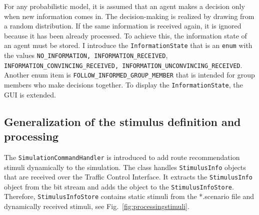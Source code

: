 For any probabilistic model, it is assumed that an agent makes a decision only when new information comes in. The decision-making is realized by drawing from a random distribution. If the same information is received again, it is ignored because it has been already processed. To achieve this, the information state of an agent must be stored. 
I introduce the \lstinline{InformationState} that is an \lstinline{enum} with the values \lstinline{NO_INFORMATION, INFORMATION_RECEIVED}, \lstinline{INFORMATION_CONVINCING_RECEIVED, INFORMATION_UNCONVINCING_RECEIVED}. Another enum item is \lstinline{FOLLOW_INFORMED_GROUP_MEMBER} that is intended for group members who make decisions together. 
To display the \lstinline{InformationState}, the GUI is extended. 





\subsection{Generalization of the stimulus definition and processing}
\label{sec:generalizestimulus}

The \lstinline{SimulationCommandHandler} is introduced to add route recommendation stimuli dynamically to the simulation. The class handles \lstinline{StimulusInfo} objects that are received over the Traffic Control Interface. It extracts the \lstinline{StimulusInfo} object from the bit stream and adds the object to the \lstinline{StimulusInfoStore}. Therefore, \lstinline{StimulusInfoStore} contains static stimuli from the *.scenario file and dynamically received stimuli, see Fig.~\ref{fig:processingstimuli}. 



